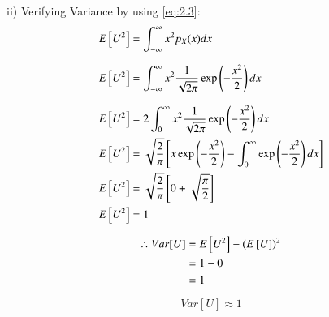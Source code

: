 \documentclass[journal,12pt,twocolumn]{IEEEtran}
\renewcommand\thesection{\arabic{section}}
\begin{document}
\begin{enumerate}[label=\thesection.\arabic*
,ref=\thesection.\theenumi]
%
ii) Verifying Variance by using \eqref{eq:2.3}:
\begin{align*}
     E{}\left[U^2\right] &= \int_{-\infty}^{\infty} x^2 p_X(x) dx\\[7pt]
     E{}\left[U^2\right] &= \int_{-\infty}^{\infty} x^2 \frac{1}{\sqrt{2\pi}}\exp\left(-\frac{x^2}{2}\right) dx \\[7pt]
     E{}\left[U^2\right] &= 2\int_{0}^{\infty} x^2 \frac{1}{\sqrt{2\pi}}\exp\left(-\frac{x^2}{2}\right) dx \\
     E{}\left[U^2\right] &= \sqrt{\frac{2}{\pi}} {}\left[x \exp\left(-\frac{x^2}{2}\right) - \int_{0}^{\infty}\exp\left( -\frac{x^2}{2}\right) dx\right]\\
     E{}\left[U^2\right] &= \sqrt{\frac{2}{\pi}} {}\left[0 + \sqrt{\frac{\pi}{2}}\right]\\
     E{}\left[U^2\right] &= 1
     \end{align*}
\end{enumerate}
\begin{align*}
        \therefore Var[U] &=  E{}\left[U^2\right] -  (E{}\left[U\right])^2\\
        &= 1 - 0\\
        &=1
\end{align*}
\begin{align}
    Var[U] \approx 1
\end{align}
\end{document}
